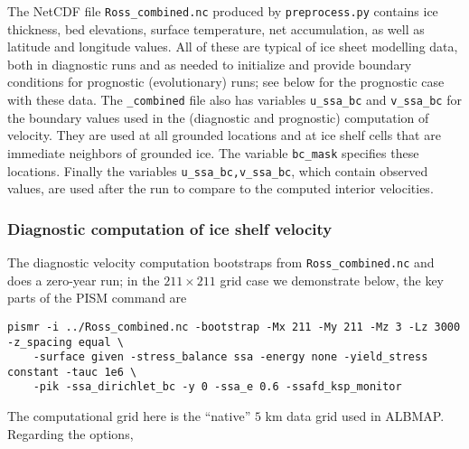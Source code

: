 The NetCDF file \texttt{Ross_combined.nc} produced by \texttt{preprocess.py} contains ice thickness, bed elevations, surface temperature, net accumulation, as well as latitude and longitude values.  All of these are typical of ice sheet modelling data, both in diagnostic runs and as needed to initialize and provide boundary conditions for prognostic (evolutionary) runs; see below for the prognostic case with these data.  The \texttt{_combined} file also has variables \texttt{u_ssa_bc} and \texttt{v_ssa_bc} for the boundary values used in the (diagnostic and prognostic) computation of velocity.  They are used at all grounded locations and at ice shelf cells that are immediate neighbors of grounded ice.  The variable \texttt{bc_mask} specifies these locations.  Finally the variables \texttt{u_ssa_bc,v_ssa_bc}, which contain observed values, are used after the run to compare to the computed interior velocities.

\subsubsection*{Diagnostic computation of ice shelf velocity}  The diagnostic velocity computation bootstraps from \texttt{Ross_combined.nc} and does a zero-year run; in the $211\times 211$ grid case we demonstrate below, the key parts of the PISM command are

\begin{verbatim}
pismr -i ../Ross_combined.nc -bootstrap -Mx 211 -My 211 -Mz 3 -Lz 3000 -z_spacing equal \
    -surface given -stress_balance ssa -energy none -yield_stress constant -tauc 1e6 \
    -pik -ssa_dirichlet_bc -y 0 -ssa_e 0.6 -ssafd_ksp_monitor
\end{verbatim}

\noindent The computational grid here is the ``native'' $5$ km data grid used in ALBMAP.  Regarding the options,

